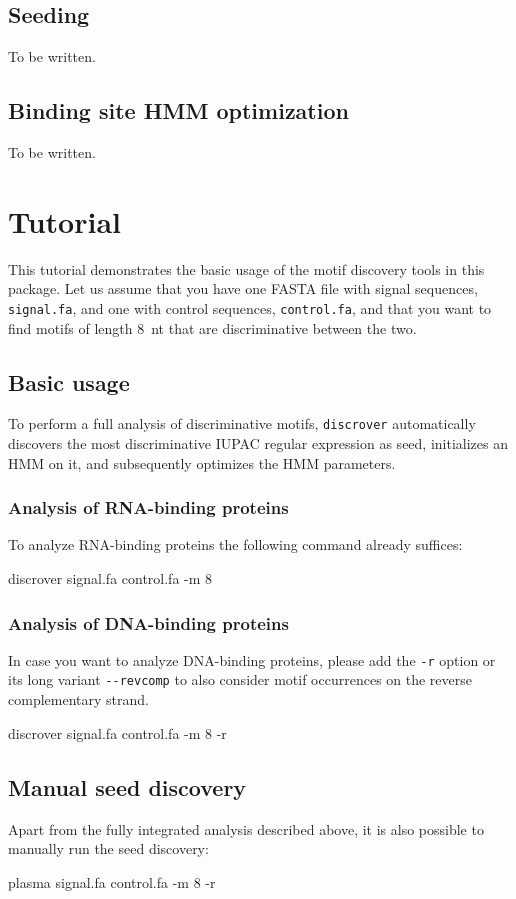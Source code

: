 \documentclass[a4paper]{article}
\newcommand{\discrover}[0]{\texttt{discrover}}
\begin{document}
\subsection{Seeding}
To be written.
\subsection{Binding site HMM optimization}
To be written.

\section{Tutorial}
This tutorial demonstrates the basic usage of the motif discovery tools in this package.
Let us assume that you have one FASTA file with signal sequences, \verb|signal.fa|, and one with control sequences, \verb|control.fa|, and that you want to find motifs of length 8~nt that are discriminative between the two.
\subsection{Basic usage}
To perform a full analysis of discriminative motifs, \discrover{} automatically discovers the most discriminative IUPAC regular expression as seed, initializes an HMM on it, and subsequently optimizes the HMM parameters.
\subsubsection{Analysis of RNA-binding proteins}
To analyze RNA-binding proteins the following command already suffices:\\
\begin{verbbox}
discrover signal.fa control.fa -m 8
\end{verbbox}
\fbox{\theverbbox[t]}

\subsubsection{Analysis of DNA-binding proteins}
In case you want to analyze DNA-binding proteins, please add the \verb|-r| option or its long variant \verb|--revcomp| to also consider motif occurrences on the reverse complementary strand.\\
\begin{verbbox}
discrover signal.fa control.fa -m 8 -r
\end{verbbox}
\fbox{\theverbbox[t]}

\subsection{Manual seed discovery}
\label{tutorial:plasma}
Apart from the fully integrated analysis described above, it is also possible to manually run the seed discovery:\\
\begin{verbbox}
plasma signal.fa control.fa -m 8 -r
\end{verbbox}
\fbox{\theverbbox[t]}
\end{document}
